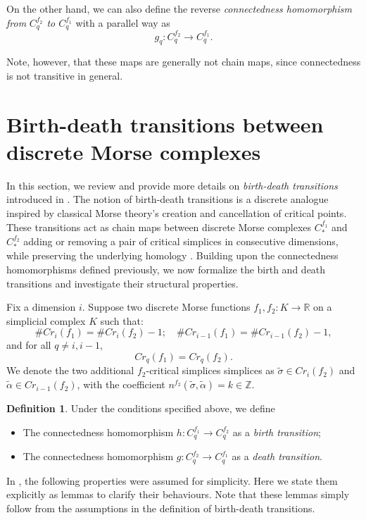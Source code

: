 \documentclass[a4paper,12pt,notitlepage]{amsart}
\theoremstyle{definition}%
\theoremstyle{definition}%
\theoremstyle{definition}%
\newtheorem{definition}[theorem]{Definition}
\newcommand{\R}{\mathbb{R}}
\begin{document}
On the other hand, 	
we can also define the reverse \textit{connectedness homomorphism}
\textit{from} \textit{$C_q^{f_2}$ to
$C_q^{f_1}$}
with a parallel way 
as 
$$g_q: C_{q}^{f_2} \to C_{q}^{f_1}.$$


Note, 
however, 
that these maps are 
generally not chain maps, 
since connectedness is not transitive in general.



\section{Birth-death transitions between discrete Morse complexes}
In this section,
we review and provide more details on
\textit{birth-death transitions} introduced in \cite{no.2}.
The notion of birth-death transitions  is  a discrete analogue inspired
 by classical Morse theory’s creation and cancellation of critical points. 
These transitions act as chain maps between discrete Morse complexes
$C_{\ast}^{f_1}$
and 
$C_{\ast}^{f_2}$
adding or removing a pair of critical simplices in consecutive dimensions,
while preserving the underlying homology \cite{no.2}.
Building upon the 
connectedness homomorphisms defined previously, we now formalize the birth and death transitions and investigate their structural properties.


Fix a dimension $i$.
Suppose two discrete Morse functions 
$f_1, f_2: K\to \R$ on a simplicial complex $K$ such that:
$$\#Cr_i(f_1)= \# Cr_i(f_2) -1;\quad \#Cr_{i-1}(f_1)=\# Cr_{i-1}(f_2) -1,$$
and for all  $q \neq i, i-1$, 
$$Cr_q(f_1)= Cr_q(f_2).$$
We denote the two additional $f_2$-critical simplices
simplices as 
$\tilde{\sigma}\in Cr_i(f_2)$
and
$\tilde{\alpha}\in Cr_{i-1}(f_2)$,
with the coefficient
$n^{f_2}(\tilde{\sigma},\tilde{\alpha})=k\in \mathbb{Z}.$
 

 
 \begin{definition}\label{birth-death transition}
Under the conditions specified above,  
we define
\begin{itemize}
    \item The connectedness homomorphism $h : C_q^{f_1} \to C_q^{f_2}$ as a \textit{birth transition};
    \item The connectedness homomorphism $g : C_q^{f_2} \to C_q^{f_1}$ as a \textit{death transition}.
\end{itemize}
 
\end{definition}

In  \cite{no.2},
 the following properties were assumed 
for simplicity.
Here we 
state them explicitly as lemmas to clarify their behaviours.
Note that these lemmas simply follow from 
the assumptions in the definition of 
birth-death transitions.
\end{document}
